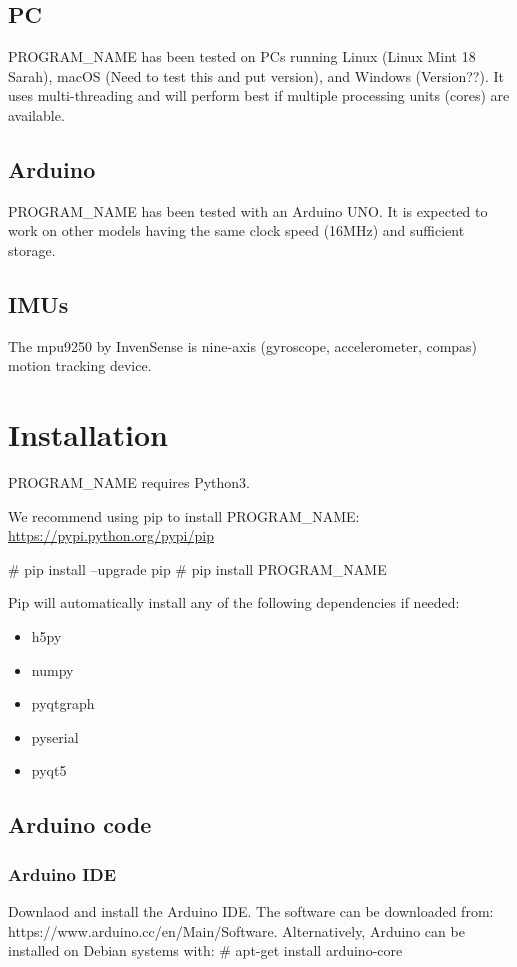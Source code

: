 \documentclass[11pt,letterpaper,article]{memoir}
\newcommand{\name}{PROGRAM_NAME}
\begin{document}
\subsection{PC}
\name{} has been tested on PCs running Linux (Linux Mint 18 Sarah), macOS (Need to test this and
put version), and Windows (Version??). It uses multi-threading and will perform
best if multiple processing units (cores) are available.

\subsection{Arduino}
\name{} has been tested with an Arduino UNO. It is expected to work on other models having
the same clock speed (16MHz) and sufficient storage.

\subsection{IMUs}
The mpu9250 by InvenSense is nine-axis (gyroscope, accelerometer, compas) motion tracking device.







\section{Installation}

\name{} requires Python3.

We recommend using pip to install \name{}:
\url{https://pypi.python.org/pypi/pip}

\# pip install --upgrade pip
\# pip install \name

Pip will automatically install any of the following dependencies if needed:
\begin{itemize}
\item h5py
\item numpy
\item pyqtgraph
\item pyserial
\item pyqt5
\end{itemize}


\subsection{Arduino code}

\subsubsection{Arduino IDE}
Downlaod and install the Arduino IDE.
The software can be downloaded from:
https://www.arduino.cc/en/Main/Software.
Alternatively, Arduino can be installed on Debian systems with:
\# apt-get install arduino-core
\end{document}
